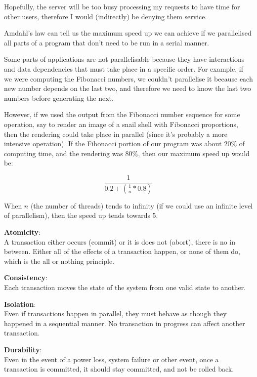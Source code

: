 Hopefully, the server will be too busy processing my requests to have time for
other users, therefore I would (indirectly) be denying them service.


Amdahl's law can tell us the maximum speed up we can achieve if we parallelised
all parts of a program that don't need to be run in a serial manner.

Some parts of applications are not parallelisable because they have interactions
and data dependencies that must take place in a specific order. For example, if
we were computing the Fibonacci numbers, we couldn't parallelise it because
each new number depends on the last two, and therefore we need to know the last
two numbers before generating the next.

However, if we used the output from the Fibonacci number sequence for some
operation, say to render an image of a snail shell with Fibonacci proportions,
then the rendering could take place in parallel (since it's probably a more
intensive operation). If the Fibonacci portion of our program was about $20\%$
of computing time, and the rendering was $80\%$, then our maximum speed up would
be:

\[
  \frac{1}{0.2 + (\frac{1}{n} * 0.8)}
\]

When $n$ (the number of threads) tends to infinity (if we could use an infinite
level of parallelism), then the speed up tends towards 5.


\begin{description}
  \item \textbf{Atomicity}:\\
    A transaction either occurs (commit) or it is does not (abort), there is no
    in between. Either all of the effects of a transaction happen, or none of
    them do, which is the all or nothing principle.
  \item \textbf{Consistency}:\\
    Each transaction moves the state of the system from one valid state to
    another.
  \item \textbf{Isolation}:\\
    Even if transactions happen in parallel, they must behave as though they
    happened in a sequential manner. No transaction in progress can affect
    another transaction.
  \item \textbf{Durability}:\\
    Even in the event of a power loss, system failure or other event, once a 
    transaction is committed, it should stay committed, and not be rolled back.
\end{description}

